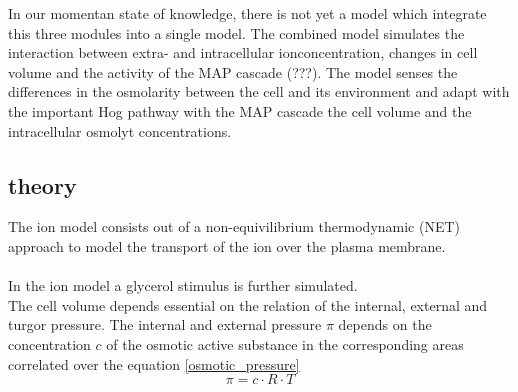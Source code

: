 In our momentan state of knowledge, there is not yet a model which integrate this three modules into a single model. The combined model simulates the interaction between extra- and intracellular ionconcentration, changes in cell volume and the activity of the MAP cascade (???). The model senses the differences in the osmolarity between the cell and its environment and adapt with the important Hog pathway with the MAP cascade the cell volume and the intracellular osmolyt concentrations. 

\subsection{theory}
The ion model consists out of a non-equivilibrium thermodynamic (NET) approach to model the transport of the ion over the plasma membrane. \\\\
In the ion model a glycerol stimulus is further simulated. \\
The cell volume depends essential on the relation of the internal, external and turgor pressure. The internal and external pressure $\pi$ depends on the concentration $c$ of the osmotic active substance in the corresponding areas correlated over the equation \ref{osmotic_pressure}
\begin{equation} \label{osmotic_pressure}
	\pi = c \cdot R \cdot T	
\end{equation} 




